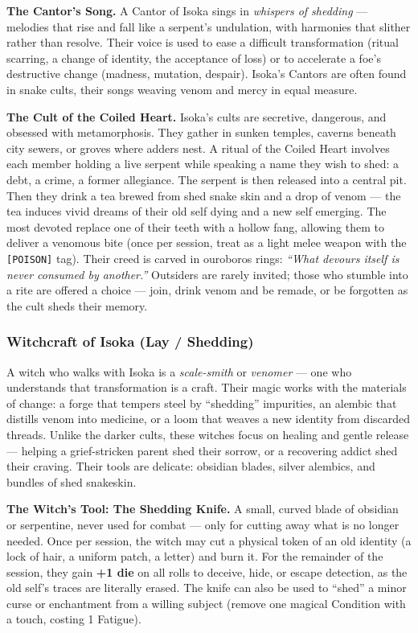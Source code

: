 \textbf{The Cantor's Song.} A Cantor of Isoka sings in \textit{whispers of shedding} --- melodies that rise and fall like a serpent's undulation, with harmonies that slither rather than resolve. Their voice is used to ease a difficult transformation (ritual scarring, a change of identity, the acceptance of loss) or to accelerate a foe's destructive change (madness, mutation, despair). Isoka's Cantors are often found in snake cults, their songs weaving venom and mercy in equal measure.

\textbf{The Cult of the Coiled Heart.} Isoka's cults are secretive, dangerous, and obsessed with metamorphosis. They gather in sunken temples, caverns beneath city sewers, or groves where adders nest. A ritual of the Coiled Heart involves each member holding a live serpent while speaking a name they wish to shed: a debt, a crime, a former allegiance. The serpent is then released into a central pit. Then they drink a tea brewed from shed snake skin and a drop of venom --- the tea induces vivid dreams of their old self dying and a new self emerging. The most devoted replace one of their teeth with a hollow fang, allowing them to deliver a venomous bite (once per session, treat as a light melee weapon with the \texttt{[POISON]} tag). Their creed is carved in ouroboros rings: \textit{``What devours itself is never consumed by another.''} Outsiders are rarely invited; those who stumble into a rite are offered a choice --- join, drink venom and be remade, or be forgotten as the cult sheds their memory.

\subsubsection*{Witchcraft of Isoka (Lay / Shedding)}

A witch who walks with Isoka is a \textit{scale-smith} or \textit{venomer} --- one who understands that transformation is a craft. Their magic works with the materials of change: a forge that tempers steel by ``shedding'' impurities, an alembic that distills venom into medicine, or a loom that weaves a new identity from discarded threads. Unlike the darker cults, these witches focus on healing and gentle release --- helping a grief-stricken parent shed their sorrow, or a recovering addict shed their craving. Their tools are delicate: obsidian blades, silver alembics, and bundles of shed snakeskin.

\textbf{The Witch's Tool: The Shedding Knife.} A small, curved blade of obsidian or serpentine, never used for combat --- only for cutting away what is no longer needed. Once per session, the witch may cut a physical token of an old identity (a lock of hair, a uniform patch, a letter) and burn it. For the remainder of the session, they gain \textbf{+1 die} on all rolls to deceive, hide, or escape detection, as the old self's traces are literally erased. The knife can also be used to ``shed'' a minor curse or enchantment from a willing subject (remove one magical Condition with a touch, costing 1 Fatigue).

